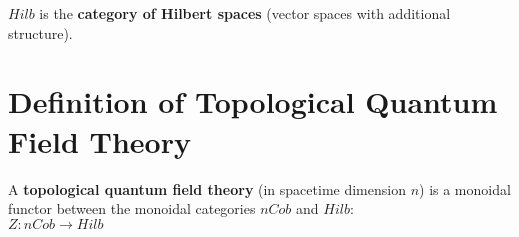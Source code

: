 \documentclass[a4paper, twoside, english, 11pt]{book}
\begin{document}
$Hilb$ is the \textbf{category of Hilbert spaces} (vector spaces with additional structure).



\section{Definition of Topological Quantum Field Theory}

A \textbf{topological quantum field theory} (in spacetime dimension $n$) is a monoidal functor between the monoidal categories $nCob$ and $Hilb$: \\

$Z : nCob \rightarrow Hilb$
\end{document}
